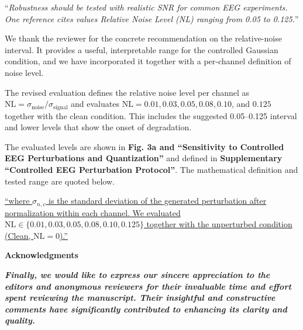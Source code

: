 \documentclass[12pt,technote,onecolumn]{IEEEtran}
\begin{document}
\EvidenceMainFigThree

\vspace{4mm}

``{\it Robustness should be tested with realistic SNR for common EEG
experiments.\\
One reference cites values Relative Noise Level (NL) ranging from 0.05
to 0.125.}''
\vspace{1mm}


We thank the reviewer for the concrete recommendation on the relative-noise interval. It provides a useful, interpretable range for the controlled Gaussian condition, and we have incorporated it together with a per-channel definition of noise level.

The revised evaluation defines the relative noise level per channel as
\(\mathrm{NL}=\sigma_{\mathrm{noise}}/\sigma_{\mathrm{signal}}\) and
evaluates $\mathrm{NL}=0.01, 0.03, 0.05, 0.08, 0.10$, and $0.125$ together with the
clean condition. This includes the suggested 0.05--0.125 interval and
lower levels that show the onset of degradation.



The evaluated levels are shown in \textbf{Fig. 3a and ``Sensitivity to Controlled EEG Perturbations and Quantization''} and defined in \textbf{Supplementary ``Controlled EEG Perturbation Protocol''}. The mathematical definition and tested range are quoted below.

\uline{``where $\sigma_{n,c}$ is the standard deviation of the generated perturbation after normalization within each channel. We evaluated $\mathrm{NL}\in\{0.01,0.03,0.05,0.08,0.10,0.125\}$ together with the unperturbed condition (Clean, $\mathrm{NL}=0$).''}

\vspace{10mm}
\begin{center}
{\large\textbf{Acknowledgments}}\\[3mm]
\begin{minipage}{0.9\textwidth}
\textit{\textbf{Finally, we would like to express our sincere appreciation to the editors and anonymous reviewers for their invaluable time and effort spent reviewing the manuscript. Their insightful and constructive comments have significantly contributed to enhancing its clarity and quality.}}
\end{minipage}
\end{center}
\end{document}
